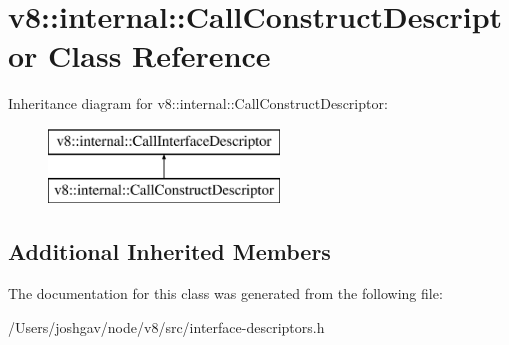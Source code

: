 \hypertarget{classv8_1_1internal_1_1_call_construct_descriptor}{}\section{v8\+:\+:internal\+:\+:Call\+Construct\+Descriptor Class Reference}
\label{classv8_1_1internal_1_1_call_construct_descriptor}
Inheritance diagram for v8\+:\+:internal\+:\+:Call\+Construct\+Descriptor\+:\begin{figure}[H]
\begin{center}
\leavevmode
\includegraphics[height=2.000000cm]{classv8_1_1internal_1_1_call_construct_descriptor}
\end{center}
\end{figure}
\subsection*{Additional Inherited Members}


The documentation for this class was generated from the following file\+:\begin{DoxyCompactItemize}
\item 
/\+Users/joshgav/node/v8/src/interface-\/descriptors.\+h\end{DoxyCompactItemize}
